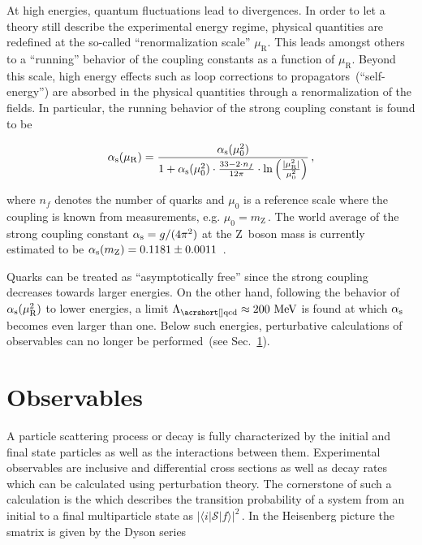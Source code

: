 At high energies, quantum fluctuations lead to divergences. In order to let a theory still describe the experimental energy regime, physical quantities are redefined at the so-called ``renormalization scale'' $\mu_\mathrm{R}$. This leads amongst others to a ``running'' behavior of the coupling constants as a function of $\mu_\mathrm{R}$. Beyond this scale, high energy effects such as loop corrections to propagators~(``self-energy'') are absorbed in the physical quantities through a renormalization of the fields. In particular, the running behavior of the strong coupling constant is found to be 

\begin{equation}
{\alpha_\textrm{s}}(\mu_\mathrm{R})=\frac{{\alpha_\textrm{s}}(\mu_{0}^{2})}{1+{\alpha_\textrm{s}}(\mu_\mathrm{0}^2)\cdot\tfrac{33-2\cdot n_f}{12\pi}\cdot\ln\Big(\tfrac{|\mu_\mathrm{R}^2|}{\mu_{0}^{2}}\Big)}\,,
\end{equation}

where $n_f$ denotes the number of quarks and $\mu_{0}$ is a reference scale where the coupling is known from measurements, e.g. $\mu_{0}=m_\mathrm{Z}\,$. The world average of the strong coupling constant ${\alpha_\textrm{s}}=g/(4\pi^2)$ at the $\mathrm{Z}$~boson mass is currently estimated to be ${\alpha_\textrm{s}}(m_\mathrm{Z})=0.1181\pm0.0011$~\cite{Olive:2016xmw}. 

Quarks can be treated as ``asymptotically free'' since the strong coupling decreases towards larger energies. On the other hand, following the behavior of ${\alpha_\textrm{s}}(\mu^2_\mathrm{R})$ to lower energies, a limit $\Lambda_\mathrm{\gls{qcd}}\approx 200~\MeV$ is found at which ${\alpha_\textrm{s}}$ becomes even larger than one. Below such energies, perturbative calculations of observables can no longer be performed~(see Sec.~\ref{sec:theory-observables}). 





\section{Observables}
\label{sec:theory-observables}

A particle scattering process or decay is fully characterized by the initial and final state particles as well as the interactions between them. Experimental observables are inclusive and differential cross sections as well as decay rates which can be calculated using perturbation theory. The cornerstone of such a calculation is the  which describes the transition probability of a system from an initial to a final multiparticle state as $|\langle i|\mathcal{S}|f\rangle|^{2}\,$. In the Heisenberg picture the \gls{smatrix} is given by the Dyson series

